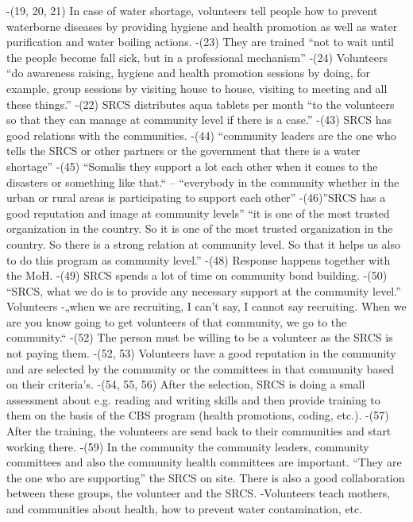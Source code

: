 -(19, 20, 21) In case of water shortage, volunteers tell people how to prevent waterborne diseases by providing hygiene and health promotion as well as water purification and water boiling actions.
-(23) They are trained “not to wait until the people become fall sick, but in a professional mechanism”
-(24) Volunteers “do awareness raising, hygiene and health promotion sessions by doing, for example, group sessions by visiting house to house, visiting to meeting and all these things.”
-(22) SRCS distributes aqua tablets per month “to the volunteers so that they can manage at community level if there is a case.”
-(43) SRCS has good relations with the communities.
-(44) “community leaders are the one who tells the SRCS or other partners or the government that there is a water shortage”
-(45) “Somalis they support a lot each other when it comes to the disasters or something like that.“ – “everybody in the community whether in the urban or rural areas is participating to support each other”
-(46)”SRCS has a good reputation and image at community levels” “it is one of the most trusted organization in the country. So it is one of the most trusted organization in the country. So there is a strong relation at community level. So that it helps us also to do this program as community level.”
-(48) Response happens together with the MoH.
-(49) SRCS spends a lot of time on community bond building.
-(50) “SRCS, what we do is to provide any necessary support at the community level.”
Volunteers
-„when we are recruiting, I can't say, I cannot say recruiting. When we are you know going to get volunteers of that community, we go to the community.“
-(52) The person must be willing to be a volunteer as the SRCS is not paying them.
-(52, 53) Volunteers have a good reputation in the community and are selected by the community or the committees in that community based on their criteria’s.
-(54, 55, 56) After the selection, SRCS is doing a small assessment about e.g. reading and writing skills and then provide training to them on the basis of the CBS program (health promotions, coding, etc.).
-(57) After the training, the volunteers are send back to their communities and start working there.
-(59) In the community the community leaders, community committees and also the community health committees are important. “They are the one who are supporting” the SRCS on site. There is also a good collaboration between these groups, the volunteer and the SRCS.
-Volunteers teach mothers, and communities about health, how to prevent water contamination, etc.



